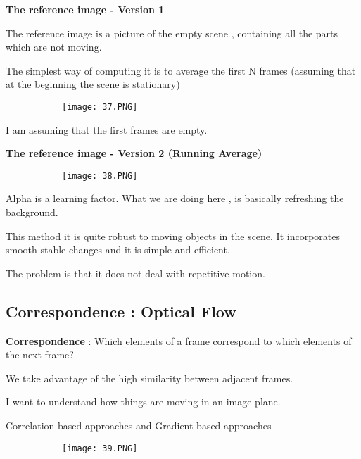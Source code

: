 \documentclass{article}
\begin{document}
\textbf{The reference image - Version 1}

The reference image is a picture of the empty scene , containing all the parts which are not moving.

The simplest way of computing it is to average the first N frames (assuming that at the beginning the scene is stationary)

 
\begin{figure}[ht!]
  \centering
  \begin{subfigure}[b]{0.8\linewidth}
    \texttt{[image: 37.PNG]}
  \end{subfigure}
\end{figure}

I am assuming that the first frames are empty.

\vspace{30mm}

\textbf{The reference image - Version 2 (Running Average)}


\begin{figure}[ht!]
  \centering
  \begin{subfigure}[b]{0.8\linewidth}
    \texttt{[image: 38.PNG]}
  \end{subfigure}
\end{figure}

Alpha is a learning factor. What we are doing here , is basically refreshing the background.

This method it is quite robust to moving objects in the scene. It incorporates smooth stable changes and it is simple and efficient.

The problem is that it does not deal with repetitive motion.

\subsection{Correspondence : Optical Flow}

\textbf{Correspondence} : Which elements of a frame correspond to which elements of the next frame?

We take advantage of the high similarity between adjacent frames.

I want to understand how things are moving in an image plane.

Correlation-based approaches and Gradient-based approaches

\begin{figure}[ht!]
  \centering
  \begin{subfigure}[b]{0.7\linewidth}
    \texttt{[image: 39.PNG]}
  \end{subfigure}
\end{figure}
\end{document}
